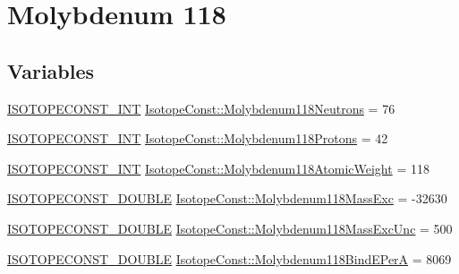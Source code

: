 \hypertarget{group___isotope_const-_molybdenum-_mo118}{}\section{Molybdenum 118}
\label{group___isotope_const-_molybdenum-_mo118}
\subsection*{Variables}
\begin{DoxyCompactItemize}
\item 
\mbox{\hyperlink{group___isotope_const-_macros_ga5f18360b3e99483a35c32d789e62621c}{I\+S\+O\+T\+O\+P\+E\+C\+O\+N\+S\+T\+\_\+\+I\+NT}} \mbox{\hyperlink{group___isotope_const-_molybdenum-_mo118_gafaaf8c521e59f358b771926afc898c07}{Isotope\+Const\+::\+Molybdenum118\+Neutrons}} = 76
\item 
\mbox{\hyperlink{group___isotope_const-_macros_ga5f18360b3e99483a35c32d789e62621c}{I\+S\+O\+T\+O\+P\+E\+C\+O\+N\+S\+T\+\_\+\+I\+NT}} \mbox{\hyperlink{group___isotope_const-_molybdenum-_mo118_gad63967e2555a4f3650febcc428a137b3}{Isotope\+Const\+::\+Molybdenum118\+Protons}} = 42
\item 
\mbox{\hyperlink{group___isotope_const-_macros_ga5f18360b3e99483a35c32d789e62621c}{I\+S\+O\+T\+O\+P\+E\+C\+O\+N\+S\+T\+\_\+\+I\+NT}} \mbox{\hyperlink{group___isotope_const-_molybdenum-_mo118_ga001ee85e8abfede410f992c144f88cac}{Isotope\+Const\+::\+Molybdenum118\+Atomic\+Weight}} = 118
\item 
\mbox{\hyperlink{group___isotope_const-_macros_ga8f45a7272ce02c0b4c65c44636ed719a}{I\+S\+O\+T\+O\+P\+E\+C\+O\+N\+S\+T\+\_\+\+D\+O\+U\+B\+LE}} \mbox{\hyperlink{group___isotope_const-_molybdenum-_mo118_gadd0246427cbe944ebf073c47c8e44143}{Isotope\+Const\+::\+Molybdenum118\+Mass\+Exc}} = -\/32630
\item 
\mbox{\hyperlink{group___isotope_const-_macros_ga8f45a7272ce02c0b4c65c44636ed719a}{I\+S\+O\+T\+O\+P\+E\+C\+O\+N\+S\+T\+\_\+\+D\+O\+U\+B\+LE}} \mbox{\hyperlink{group___isotope_const-_molybdenum-_mo118_gaac71b25aef36e76a28335337e031159a}{Isotope\+Const\+::\+Molybdenum118\+Mass\+Exc\+Unc}} = 500
\item 
\mbox{\hyperlink{group___isotope_const-_macros_ga8f45a7272ce02c0b4c65c44636ed719a}{I\+S\+O\+T\+O\+P\+E\+C\+O\+N\+S\+T\+\_\+\+D\+O\+U\+B\+LE}} \mbox{\hyperlink{group___isotope_const-_molybdenum-_mo118_ga7085c8ababe72130742f02b0b4e23eff}{Isotope\+Const\+::\+Molybdenum118\+Bind\+E\+PerA}} = 8069
\item 

\end{DoxyCompactItemize}
